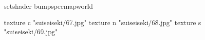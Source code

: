 setshader bumpspecmapworld

    texture c "suiseiseki/67.jpg"
    texture n "suiseiseki/68.jpg"
    texture s "suiseiseki/69.jpg"
